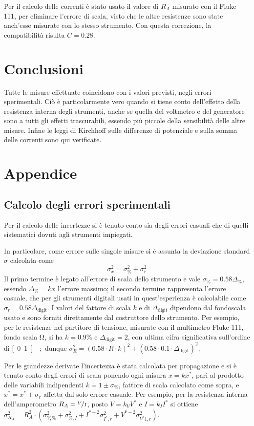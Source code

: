 \documentclass[italian,a4paper]{article}
\begin{document}
Per il calcolo delle correnti è stato usato il valore di $R_A$ misurato con il Fluke 111, per eliminare l'errore di scala, visto che le altre resistenze sono state anch'esse misurate con lo stesso strumento. Con questa correzione, la compatibilità risulta $C = 0.28$.
\section{Conclusioni}
Tutte le misure effettuate coincidono con i valori previsti, negli errori sperimentali. Ciò è particolarmente vero quando si tiene conto dell'effetto della resistenza interna degli strumenti, anche se quella del voltmetro e del generatore sono a tutti gli effetti trascurabili, essendo più piccole della sensibilità delle altre misure. Infine le leggi di Kirchhoff sulle differenze di potenziale e sulla somma delle correnti sono qui verificate.
\section{Appendice}
\subsection{Calcolo degli errori sperimentali}
Per il calcolo delle incertezze si è tenuto conto sia degli errori casuali che di quelli sistematici dovuti agli strumenti impiegati.

In particolare, come errore sulle singole misure si è assunta la deviazione standard $\sigma$ calcolata come $$\sigma_x^2=\sigma^2_\%+\sigma^2_r$$
Il primo termine è legato all'errore di scala dello strumento e vale $\sigma_\%=0.58\Delta_\%$, essendo $\Delta_\%=kx $ l'errore massimo; il secondo termine rappresenta l'errore casuale, che per gli strumenti digitali usati in quest'esperienza è calcolabile come $\sigma_r=0.58\Delta_{\text{digit}}$. I valori del fattore di scala $k$ e di $\Delta_{\text{digit}}$ dipendono dal fondoscala usato e sono forniti direttamente dal costruttore dello strumento.
Per esempio, per le resistenze nel partitore di tensione, misurate con il multimetro Fluke 111, fondo scala \unit[600]{\ohm}, si ha $k=0.9 \%$ e $\Delta_{\text{digit}}=2$, con ultima cifra significativa sull'ordine di \unit[0.1]{\ohm}; dunque $\sigma^2_R=(0.58\cdot R\cdot k)^2+(0.58\cdot 0.1 \cdot \Delta_{\text{digit}} )^2$.

Per le grandezze derivate l'incertezza è stata calcolata per propagazione e si è tenuto conto degli errori di scala ponendo ogni misura $x=kx^*$, pari al prodotto delle variabili indipendenti $k=1\pm \sigma_\%$, fattore di scala calcolato come sopra, e $x^*=x^*\pm \sigma_r$ affetta dal solo errore casuale.
Per esempio, per la resistenza interna dell'amperometro $R_A=\nicefrac{V}{I}$, posto $V=k_V V^*$ e $I=k_I I^*$
si ottiene $\sigma^2_{R_A}=R^2_A\cdot\left(\sigma^2_{V,\%}+\sigma^2_{\%,I}+I^{*-2}\sigma^2_{I^*,r}+V^{*-2}\sigma^2_{V^*1,r}\right)$.
\end{document}
